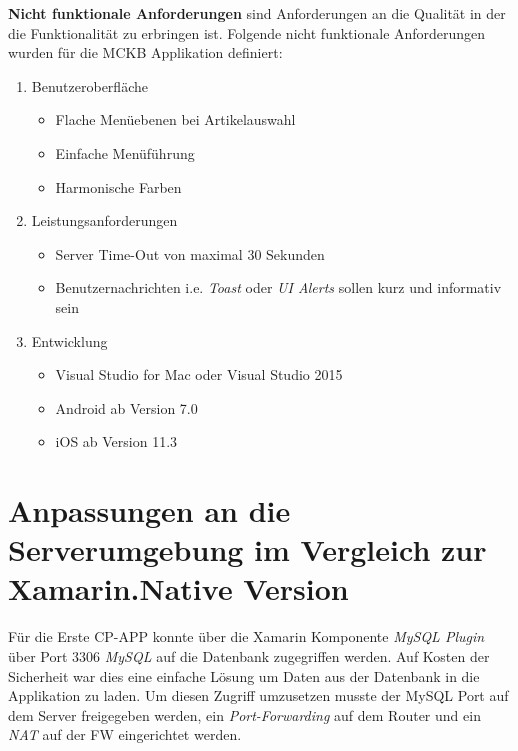	\textbf{Nicht funktionale Anforderungen } sind Anforderungen an die Qualität in der die Funktionalität zu erbringen ist. Folgende nicht funktionale Anforderungen wurden für die MCKB Applikation definiert:
	\begin{enumerate}
		\setlength\itemsep{0em}
		\item Benutzeroberfläche
		\begin{itemize}
			\setlength\itemsep{0em}
			\item Flache Menüebenen bei Artikelauswahl
			\item Einfache Menüführung
			\item Harmonische Farben
		\end{itemize}
		\item Leistungsanforderungen
		\begin{itemize}
			\item Server Time-Out von maximal 30 Sekunden
			\item Benutzernachrichten i.e. \textit{Toast} oder \textit{UI Alerts} sollen kurz und informativ sein
		\end{itemize}
		\item Entwicklung
		\begin{itemize}
			\item Visual Studio for Mac oder Visual Studio 2015
			\item Android ab Version 7.0
			\item iOS ab Version 11.3
		\end{itemize}
	\end{enumerate}

	\newpage
	

\section{Anpassungen an die Serverumgebung im Vergleich zur Xamarin.Native Version}
\label{sec:mckbspecs}

	Für die Erste CP-APP konnte über die Xamarin Komponente \textit{MySQL Plugin} über Port 3306 \textit{MySQL} auf die Datenbank zugegriffen werden\cite{Maximilian2017}. Auf Kosten der Sicherheit war dies eine einfache Lösung um Daten aus der Datenbank in die Applikation zu laden. Um diesen Zugriff umzusetzen musste der MySQL Port auf dem Server freigegeben werden, ein \textit{Port-Forwarding} auf dem Router und ein \textit{NAT} auf der FW eingerichtet werden.

